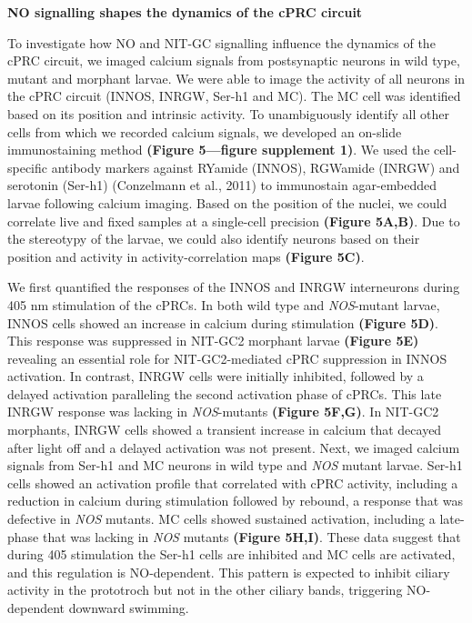 \documentclass[
  10pt,
  onecolumn]{article}
\begin{document}
\textbf{NO signalling shapes the dynamics of the cPRC circuit}

To investigate how NO and NIT-GC signalling influence the dynamics of
the cPRC circuit, we imaged calcium signals from postsynaptic neurons in
wild type, mutant and morphant larvae. We were able to image the
activity of all neurons in the cPRC circuit (INNOS, INRGW, Ser-h1 and
MC). The MC cell was identified based on its position and intrinsic
activity. To unambiguously identify all other cells from which we
recorded calcium signals, we developed an on-slide immunostaining method
\textbf{(Figure 5---figure supplement 1)}. We used the cell-specific
antibody markers against RYamide (INNOS), RGWamide (INRGW) and serotonin
(Ser-h1) (Conzelmann et al., 2011) to immunostain agar-embedded larvae
following calcium imaging. Based on the position of the nuclei, we could
correlate live and fixed samples at a single-cell precision
\textbf{(Figure 5A,B)}. Due to the stereotypy of the larvae, we could
also identify neurons based on their position and activity in
activity-correlation maps \textbf{(Figure 5C)}.

We first quantified the responses of the INNOS and INRGW interneurons
during 405 nm stimulation of the cPRCs. In both wild type and
\emph{NOS}-mutant larvae, INNOS cells showed an increase in calcium
during stimulation \textbf{(Figure 5D)}. This response was suppressed in
NIT-GC2 morphant larvae \textbf{(Figure 5E)} revealing an essential role
for NIT-GC2-mediated cPRC suppression in INNOS activation. In contrast,
INRGW cells were initially inhibited, followed by a delayed activation
paralleling the second activation phase of cPRCs. This late INRGW
response was lacking in \emph{NOS}-mutants \textbf{(Figure 5F,G)}. In
NIT-GC2 morphants, INRGW cells showed a transient increase in calcium
that decayed after light off and a delayed activation was not present.
Next, we imaged calcium signals from Ser-h1 and MC neurons in wild type
and \emph{NOS} mutant larvae. Ser-h1 cells showed an activation profile
that correlated with cPRC activity, including a reduction in calcium
during stimulation followed by rebound, a response that was defective in
\emph{NOS} mutants. MC cells showed sustained activation, including a
late-phase that was lacking in \emph{NOS} mutants \textbf{(Figure
5H,I)}. These data suggest that during 405 stimulation the Ser-h1 cells
are inhibited and MC cells are activated, and this regulation is
NO-dependent. This pattern is expected to inhibit ciliary activity in
the prototroch but not in the other ciliary bands, triggering
NO-dependent downward swimming.
\end{document}
